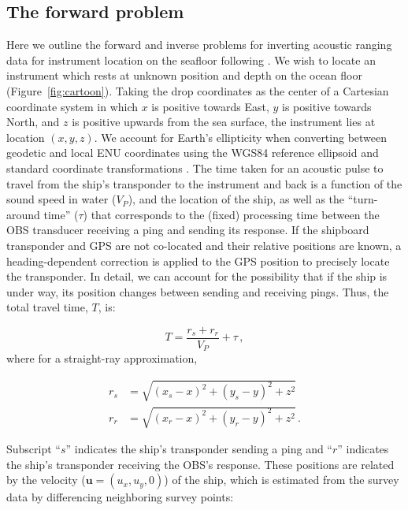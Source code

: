 

\subsection{The forward problem}

Here we outline the forward and inverse problems for inverting acoustic ranging data for instrument location on the seafloor following \citet{Creager1982}. We wish to locate an instrument which rests at unknown position and depth on the ocean floor (Figure~\ref{fig:cartoon}). Taking the drop coordinates as the center of a Cartesian coordinate system in which $x$ is positive towards East, $y$ is positive towards North, and $z$ is positive upwards from the sea surface, the instrument lies at location $(x,y,z)$. We account for Earth's ellipticity when converting between geodetic and local ENU coordinates using the WGS84 reference ellipsoid \citep{WGS84_2000} and standard coordinate transformations \citep[i.e.,][]{Hoffmann_Wellenhof_2001}. The time taken for an acoustic pulse to travel from the ship's transponder to the instrument and back is a function of the sound speed in water ($V_P$), and the location of the ship, as well as the ``turn-around time'' ($\tau$) that corresponds to the (fixed) processing time between the OBS transducer receiving a ping and sending its response. If the shipboard transponder and GPS are not co-located and their relative positions are known, a heading-dependent correction is applied to the GPS position to precisely locate the transponder. In detail, we can account for the possibility that if the ship is under way, its position changes between sending and receiving pings. Thus, the total travel time, $T$, is: 

\begin{equation}
T = \frac{r_s + r_r}{V_P} + \tau \,, \label{eq:forward_send_receive}
\end{equation}
where for a straight-ray approximation,

\begin{align}
	r_s &= \sqrt{(x_s - x)^2 + (y_s - y)^2 + z^2}\\
	r_r &= \sqrt{(x_r - x)^2 + (y_r - y)^2 + z^2} \,.
\end{align}

Subscript ``$s$'' indicates the ship's transponder sending a ping and ``$r$'' indicates the ship's transponder receiving the OBS's response. These positions are related by the velocity ($\mathbf{u} = (u_x,u_y,0)$) of the ship, which is estimated from the survey data by differencing neighboring survey points:

